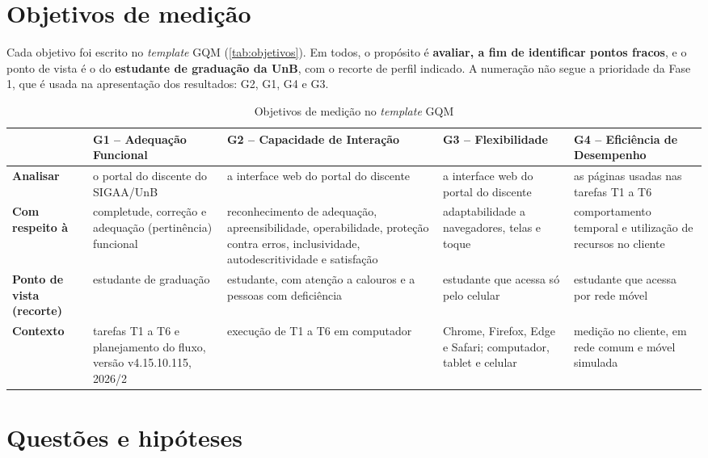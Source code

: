 \section{Objetivos de medição}
\label{sec:objetivos-gqm}

Cada objetivo foi escrito no \textit{template} GQM (\autoref{tab:objetivos}). Em todos, o propósito é \textbf{avaliar, a fim de identificar pontos fracos}, e o ponto de vista é o do \textbf{estudante de graduação da UnB}, com o recorte de perfil indicado. A numeração não segue a prioridade da Fase 1, que é usada na apresentação dos resultados: G2, G1, G4 e G3.

\begin{table}[htb]
	\caption{Objetivos de medição no \textit{template} GQM}
	\label{tab:objetivos}
	\centering
	\scriptsize
	\begin{tabularx}{\textwidth}{L{1.7cm} Y Y Y Y}
		\toprule
		& \textbf{G1 -- Adequação Funcional} & \textbf{G2 -- Capacidade de Interação} & \textbf{G3 -- Flexibilidade} & \textbf{G4 -- Eficiência de Desempenho} \\
		\midrule
		\textbf{Analisar} & o portal do discente do SIGAA/UnB & a interface web do portal do discente & a interface web do portal do discente & as páginas usadas nas tarefas T1 a T6 \\
		\textbf{Com respeito à} & completude, correção e adequação (pertinência) funcional & reconhecimento de adequação, apreensibilidade, operabilidade, proteção contra erros, inclusividade, autodescritividade e satisfação & adaptabilidade a navegadores, telas e toque & comportamento temporal e utilização de recursos no cliente \\
		\textbf{Ponto de vista (recorte)} & estudante de graduação & estudante, com atenção a calouros e a pessoas com deficiência & estudante que acessa só pelo celular & estudante que acessa por rede móvel \\
		\textbf{Contexto} & tarefas T1 a T6 e planejamento do fluxo, versão v4.15.10.115, 2026/2 & execução de T1 a T6 em computador & Chrome, Firefox, Edge e Safari; computador, tablet e celular & medição no cliente, em rede comum e móvel simulada \\
		\bottomrule
	\end{tabularx}
\end{table}

\section{Questões e hipóteses}
\label{sec:questoes}

